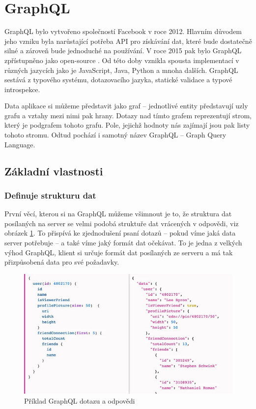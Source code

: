\documentclass[thesis=M,czech]{FITthesis}[2019/12/23]
\begin{document}
\section{GraphQL}
GraphQL bylo vytvořeno společností Facebook v roce 2012. Hlavním důvodem jeho vzniku byla narůstající potřeba API pro získávání dat, které bude dostatečně silné a zároveň bude jednoduché na používání. V roce 2015 pak bylo GraphQL zpřístupněno jako open-source \cite{graphql_fb}. Od této doby vznikla spousta implementací v různých jazycích jako je JavaScript, Java, Python a mnoha dalších. GraphQL sestává z typového systému, dotazovacího jazyka, statické validace a typové introspekce.

Data aplikace si můžeme představit jako graf -- jednotlivé entity představují uzly grafu a vztahy mezi nimi pak hrany. Dotazy nad tímto grafem reprezentují strom, který je podgrafem tohoto grafu. Pole, jejichž hodnoty nás zajímají jsou pak listy tohoto stromu. Odtud pochází i samotný název GraphQL -- Graph Query Language.

\subsection{Základní vlastnosti}
\subsubsection*{Definuje strukturu dat}
První věcí, kterou si na GraphQL můžeme všimnout je to, že struktura dat posílaných na server se velmi podobá struktuře dat vrácených v odpovědi, viz obrázek \ref{graphql-query}. To přispívá ke zjednodušení psaní dotazů -- pokud víme jaká data server potřebuje -- a také víme jaký formát dat očekávat. To je jedna z velkých výhod GraphQL, klient si určuje formát dat posílaných ze serveru a má tak přizpůsobená data pro své požadavky.

\begin{figure}[h]
    \includegraphics[width=\linewidth]{img/graphql-query.png}
    \caption{Příklad GraphQL dotazu a odpovědi \cite{graphql_query_img}}
	\label{graphql-query}
\end{figure}
\end{document}

